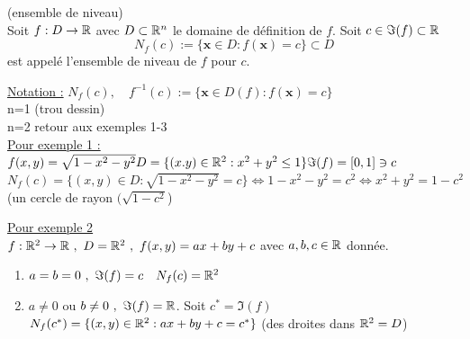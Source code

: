 \documentclass[12pt,a4paper]{article}
\begin{document}
\begin{boite}
	(ensemble de niveau)\\
	Soit $f: D\to \mathbb{R}$ avec $D\subset \mathbb{R}^n$ le domaine de définition de $f$. Soit $c\in \Im(f) \subset \mathbb{R}$
	\begin{equation*}
		N_f(c) := \{\textbf{x} \in D : f(\textbf{x}) = c\} \subset D
	\end{equation*}
	est appelé l'ensemble de niveau de $f$ pour $c$.
\end{boite}
\underline{Notation :} $N_f(c),\quad f^{-1}(c) := \{\textbf{x} \in D(f) : f(\textbf{x}) = c\}$\\
 n=1 (trou dessin)\\
n=2 retour aux exemples 1-3\\
\underline{Pour exemple 1 :}\\
$f(x,y) = \sqrt{1-x^2-y^2}\\
D = \{(x.y) \in \mathbb{R}^2 : x^2+y^2 \leq 1\}\\
\Im(f) = [0,1] \ni c$\\
$N_f(c) = \{(x,y) \in D : \sqrt{1-x^2-y^2} = c\} \iff 1-x^2-y^2=c^2 \iff x^2+y^2 = 1-c^2$ (un cercle de rayon $(\sqrt{1-c^2}$)

\underline{Pour exemple 2}\\
$f: \mathbb{R}^2 \to \mathbb{R} \ , \ D = \mathbb{R}^2 \ , \ f(x,y) = ax+by+c$ avec $a,b,c \in \mathbb{R}$ donnée.
\begin{enumerate}
	\item $a=b=0 \ , \ \Im(f) = c \quad N_f(c)  = \mathbb{R}^2$
	\item $a\neq 0$ ou $b\neq 0 \ , \ \Im(f) = \mathbb{R}$. Soit $c^* = \Im(f)$\\
	$N_f(c^*) = \{(x,y) \in \mathbb{R}^2 : ax+by+c = c^*\}$ (des droites dans $\mathbb{R}^2= D$)
\end{enumerate}
\end{document}
